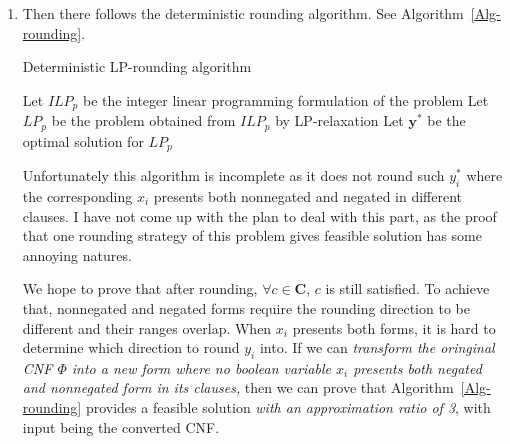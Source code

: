 \documentclass[12pt,a4paper]{article}
\makeatletter
\newtheorem*{solution}{Solution}
\theoremstyle{definition}
\renewenvironment{solution}[1][Solution] {\par\pushQED{\qed}\normalfont\topsep6\p@\@plus6\p@\relax\trivlist\item[\hskip\labelsep\bfseries#1\@addpunct{.}]\ignorespaces}{\popQED\endtrivlist\@endpefalse} \makeatother
\makeatother
\begin{document}
\begin{enumerate}
\begin{solution}
\begin{enumerate}
    Then there follows the deterministic rounding algorithm. See Algorithm~\ref{Alg-rounding}.\newline
    \begin{minipage}{0.8\textwidth}
      \centering
      \begin{algorithm}[H]
      \caption{Deterministic LP-rounding algorithm}\label{Alg-rounding}
      \BlankLine
      Let $ILP_{p}$ be the integer linear programming formulation of the problem\;
        Let $LP_{p}$ be the problem obtained from $ILP_{p}$ by LP-relaxation\;
        Let $\mathbf{y}^*$ be the optimal solution for $LP_{p}$\;
        \;
      \end{algorithm}
      \end{minipage}

      Unfortunately this algorithm is incomplete as it does not round such $y_i^*$ where the corresponding $x_i$ presents both nonnegated and negated in different clauses. I have not come up with the plan to deal with this part, as the proof that one rounding strategy of this problem gives feasible solution has some annoying natures. 
      
      We hope to prove that after rounding, $\forall c\in \mathbf{C}$, $c$ is still satisfied. To achieve that, nonnegated and negated forms require the rounding direction to be different and their ranges overlap. When $x_i$ presents both forms,  it is hard to determine which direction to round $y_i$ into. If we can \emph{transform the oringinal CNF $\Phi$ into a new form where no boolean variable $x_i$ presents both negated and nonnegated form in its clauses,} then we can prove that Algorithm~\ref{Alg-rounding} provides a feasible solution \emph{with an approximation ratio of 3}, with input being the converted CNF.


\end{enumerate}
\end{solution}
\end{enumerate}
\end{document}
